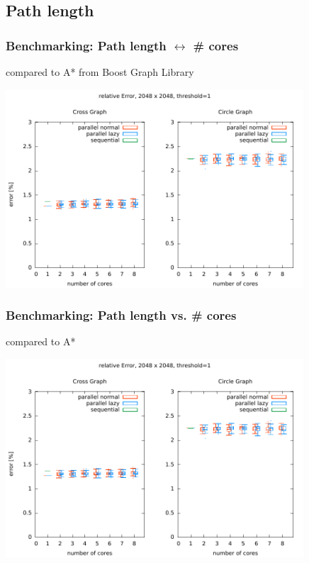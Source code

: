 \documentclass{beamer}
\begin{document}
\subsection{Path length}
\begin{frame}
\frametitle{Benchmarking: Path length $\leftrightarrow$ \# cores}
compared to A* from Boost Graph Library
\begin{center}
	\includegraphics[height=210pt]{error_cores.pdf}
\end{center}
\end{frame}

\begin{frame}
\frametitle{Benchmarking: Path length vs. \# cores}
compared to A*
\begin{center}
	\includegraphics[height=210pt]{error_cores.pdf}
\end{center}
\end{frame}

\end{document}
